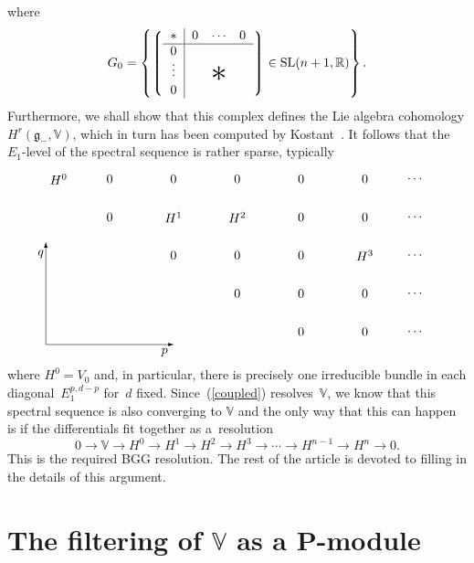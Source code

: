 \noindent
where
\[G_0=\left\{
\left\lgroup\begin{tabular}{c|ccc}$\ast$&$0$&$\!\cdots\!$&$0$\\ \hline
$0$\\
\raisebox{2pt}[15pt]{$\vdots$}&&
\raisebox{-2pt}[0pt][0pt]{\makebox[0pt]{\Huge$\ast$}}\\
$0$\end{tabular}\right\rgroup\in{\mathrm{SL}}(n+1,{\mathbb{R}})\right\}.\]
Furthermore, we shall show that this complex def\/ines the Lie algebra
cohomology $H^r({\mathfrak{g}}_-,{\mathbb{V}})$, which in turn has been
computed by Kostant~\cite{k}. It follows that the $E_1$-level of the spectral
sequence is rather sparse, typically
\begin{equation}\label{sparse}\raisebox{-70pt}{\begin{picture}(300,148)(0,10)
\put(0,20){\vector(1,0){100}}
\put(0,20){\vector(0,1){80}}
\put(93,14){\makebox(0,0){$p$}}
\put(-4,91){\makebox(0,0){$q$}}
\put(10,150){\makebox(0,0){$H^0$}}
\put(50,150){\makebox(0,0){$0$}}
\put(100,150){\makebox(0,0){$0$}}
\put(150,150){\makebox(0,0){$0$}}
\put(200,150){\makebox(0,0){$0$}}
\put(250,150){\makebox(0,0){$0$}}
\put(290,150){\makebox(0,0){$\cdots$}}
\put(290,120){\makebox(0,0){$\cdots$}}
\put(290,90){\makebox(0,0){$\cdots$}}
\put(290,60){\makebox(0,0){$\cdots$}}
\put(290,30){\makebox(0,0){$\cdots$}}
\put(50,120){\makebox(0,0){$0$}}
\put(100,120){\makebox(0,0){$H^1$}}
\put(150,120){\makebox(0,0){$H^2$}}
\put(200,120){\makebox(0,0){$0$}}
\put(250,120){\makebox(0,0){$0$}}
\put(100,90){\makebox(0,0){$0$}}
\put(150,90){\makebox(0,0){$0$}}
\put(200,90){\makebox(0,0){$0$}}
\put(250,90){\makebox(0,0){$H^3$}}
\put(150,60){\makebox(0,0){$0$}}
\put(200,60){\makebox(0,0){$0$}}
\put(250,60){\makebox(0,0){$0$}}
\put(200,30){\makebox(0,0){$0$}}
\put(250,30){\makebox(0,0){$0$}}
\end{picture}}\end{equation}
where $H^0=V_0$ and, in particular, there is precisely one irreducible bundle
in each diagonal~$E_1^{p,d-p}$ for~$d$ f\/ixed. Since~(\ref{coupled})
resolves~${\mathbb{V}}$, we know that this spectral sequence is also converging
to ${\mathbb{V}}$ and the only way that this can happen is if the dif\/ferentials
f\/it together as a~resolution
\[0\to{\mathbb{V}}
\to H^0\to H^1\to H^2\to H^3\to\cdots\to H^{n-1}\to H^n\to 0.\]
This is the required BGG resolution. The rest of the article is devoted to
f\/illing in the details of this argument.

\section[The filtering of ${\mathbb{V}}$ as a $P$-module]{The f\/iltering of $\boldsymbol{{\mathbb{V}}}$ as a $\boldsymbol{P}$-module}\label{filtering}

